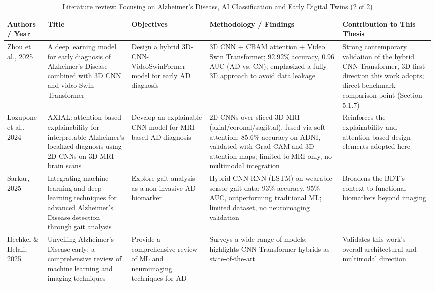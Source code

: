 \documentclass[pdflatex,sn-mathphys-num]{sn-jnl}%
\theoremstyle{thmstyleone}%
\theoremstyle{thmstyletwo}%
\theoremstyle{thmstylethree}%
\begin{document}
\begin{table}
\caption*{Literature review: Focusing on Alzheimer's Disease, AI Classification and Early Digital Twins (2 of 2)}\label{tabRW3b}
\scriptsize
\begin{tabular}{@{}p{0.10\textheight}p{0.17\textheight}p{0.15\textheight}p{0.27\textheight}p{0.18\textheight}@{}}
\toprule
\textbf{Authors / Year} & \textbf{Title} & \textbf{Objectives} & \textbf{Methodology / Findings} & \textbf{Contribution to This Thesis} \\
\midrule
Zhou et al., 2025 \cite{bib28} & A deep learning model for early diagnosis of Alzheimer's Disease combined with 3D CNN and video Swin Transformer & Design a hybrid 3D-CNN-VideoSwinFormer model for early AD diagnosis & 3D CNN + CBAM attention + Video Swin Transformer; 92.92\% accuracy, 0.96 AUC (AD vs. CN); emphasized a fully 3D approach to avoid data leakage & Strong contemporary validation of the hybrid CNN-Transformer, 3D-first direction this work adopts; direct benchmark comparison point (Section 5.1.7) \\
\addlinespace
Lozupone et al., 2024 \cite{bib11} & AXIAL: attention-based explainability for interpretable Alzheimer's localized diagnosis using 2D CNNs on 3D MRI brain scans & Develop an explainable CNN model for MRI-based AD diagnosis & 2D CNNs over sliced 3D MRI (axial/coronal/sagittal), fused via soft attention; 85.6\% accuracy on ADNI, validated with Grad-CAM and 3D attention maps; limited to MRI only, no multimodal integration & Reinforces the explainability and attention-based design elements adopted here \\
\addlinespace
Sarkar, 2025 \cite{bib25} & Integrating machine learning and deep learning techniques for advanced Alzheimer's Disease detection through gait analysis & Explore gait analysis as a non-invasive AD biomarker & Hybrid CNN-RNN (LSTM) on wearable-sensor gait data; 93\% accuracy, 95\% AUC, outperforming traditional ML; limited dataset, no neuroimaging validation & Broadens the BDT's context to functional biomarkers beyond imaging \\
\addlinespace
Hechkel \& Helali, 2025 \cite{bib26} & Unveiling Alzheimer's Disease early: a comprehensive review of machine learning and imaging techniques & Provide a comprehensive review of ML and neuroimaging techniques for AD & Surveys a wide range of models; highlights CNN-Transformer hybrids as state-of-the-art & Validates this work's overall architectural and multimodal direction \\
\addlinespace

\end{tabular}
\end{table}
\end{document}
